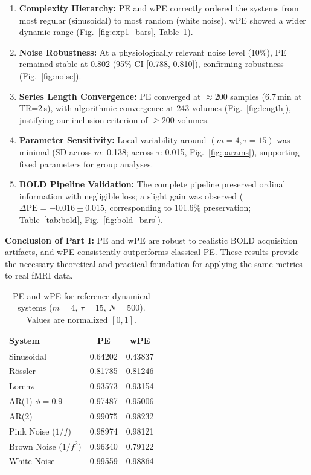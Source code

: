 \documentclass[12pt,a4paper]{article}
\begin{document}
	\begin{enumerate}[label=Exp \arabic*:, leftmargin=*]
		\item \textbf{Complexity Hierarchy:} PE and wPE correctly ordered the systems from most regular (sinusoidal) to most random (white noise). wPE showed a wider dynamic range (Fig.~\ref{fig:exp1_bars}, Table~\ref{tab:hierarchy}).
		\item \textbf{Noise Robustness:} At a physiologically relevant noise level (10\%), PE remained stable at 0.802 (95\% CI [0.788, 0.810]), confirming robustness (Fig.~\ref{fig:noise}).
		\item \textbf{Series Length Convergence:} PE converged at $\approx 200$ samples (6.7\,min at TR=2\,s), with algorithmic convergence at 243 volumes (Fig.~\ref{fig:length}), justifying our inclusion criterion of $\geq 200$ volumes.
		\item \textbf{Parameter Sensitivity:} Local variability around $(m=4,\tau=15)$ was minimal (SD across $m$: 0.138; across $\tau$: 0.015, Fig.~\ref{fig:params}), supporting fixed parameters for group analyses.
		\item \textbf{BOLD Pipeline Validation:} The complete pipeline preserved ordinal information with negligible loss; a slight gain was observed ($\Delta\text{PE} = -0.016 \pm 0.015$, corresponding to 101.6\% preservation; Table~\ref{tab:bold}, Fig.~\ref{fig:bold_bars}).
	\end{enumerate}
	
	\textbf{Conclusion of Part I:} PE and wPE are robust to realistic BOLD acquisition artifacts, and wPE consistently outperforms classical PE. These results provide the necessary theoretical and practical foundation for applying the same metrics to real fMRI data.
	
	\begin{table}[htbp]
		\centering
		\caption{PE and wPE for reference dynamical systems ($m=4$, $\tau=15$, $N=500$). Values are normalized $[0,1]$.}
		\label{tab:hierarchy}
		\begin{tabular}{@{}lcc@{}}
			\toprule
			System & PE & wPE \\ \midrule
			Sinusoidal       & 0.64202 & 0.43837 \\
			Rössler          & 0.81785 & 0.81246 \\
			Lorenz           & 0.93573 & 0.93154 \\
			AR(1) $\phi=0.9$ & 0.97487 & 0.95006 \\
			AR(2)            & 0.99075 & 0.98232 \\
			Pink Noise ($1/f$)   & 0.98974 & 0.98121 \\
			Brown Noise ($1/f^2$) & 0.96340 & 0.79122 \\
			White Noise      & 0.99559 & 0.98864 \\ \bottomrule
		\end{tabular}
	\end{table}
	
\end{document}
